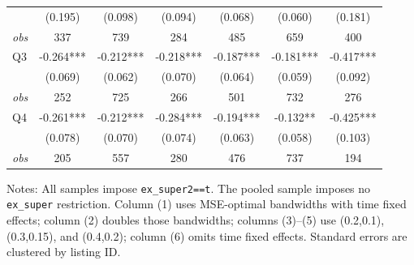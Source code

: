 \begin{table}[!htbp]
\begin{tabular}{lcccccc}
 & (0.195) & (0.098) & (0.094) & (0.068) & (0.060) & (0.181) \\
\textit{obs} & 337 & 739 & 284 & 485 & 659 & 400 \\
Q3 & -0.264*** & -0.212*** & -0.218*** & -0.187*** & -0.181*** & -0.417*** \\
 & (0.069) & (0.062) & (0.070) & (0.064) & (0.059) & (0.092) \\
\textit{obs} & 252 & 725 & 266 & 501 & 732 & 276 \\
Q4 & -0.261*** & -0.212*** & -0.284*** & -0.194*** & -0.132** & -0.425*** \\
 & (0.078) & (0.070) & (0.074) & (0.063) & (0.058) & (0.103) \\
\textit{obs} & 205 & 557 & 280 & 476 & 737 & 194 \\
\bottomrule
\end{tabular}
\begin{minipage}{0.98\textwidth}\footnotesize
Notes: All samples impose \texttt{ex\_super2==t}. The pooled sample imposes no \texttt{ex\_super} restriction. Column (1) uses MSE-optimal bandwidths with time fixed effects; column (2) doubles those bandwidths; columns (3)--(5) use (0.2,0.1), (0.3,0.15), and (0.4,0.2); column (6) omits time fixed effects. Standard errors are clustered by listing ID.
\end{minipage}
\end{table}

